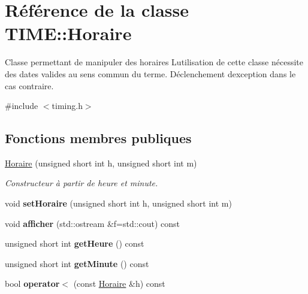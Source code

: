 \hypertarget{class_t_i_m_e_1_1_horaire}{}\section{Référence de la classe T\+I\+M\+E\+:\+:Horaire}
\label{class_t_i_m_e_1_1_horaire}


Classe permettant de manipuler des horaires L\textquotesingle{}utilisation de cette classe nécessite des dates valides au sens commun du terme. Déclenchement d\textquotesingle{}exception dans le cas contraire.  




{\ttfamily \#include $<$timing.\+h$>$}

\subsection*{Fonctions membres publiques}
\begin{DoxyCompactItemize}
\item 
\hyperlink{class_t_i_m_e_1_1_horaire_ab833c9dc3a4fdbda3894dbbd72643813}{Horaire} (unsigned short int h, unsigned short int m)
\begin{DoxyCompactList}\small\item\em Constructeur à partir de heure et minute. \end{DoxyCompactList}\item 
\hypertarget{class_t_i_m_e_1_1_horaire_ae4dd22490e383b0662fc5788bd42d370}{}void {\bfseries set\+Horaire} (unsigned short int h, unsigned short int m)\label{class_t_i_m_e_1_1_horaire_ae4dd22490e383b0662fc5788bd42d370}

\item 
\hypertarget{class_t_i_m_e_1_1_horaire_af4f27b26ed338d7fa03659107f813cf8}{}void {\bfseries afficher} (std\+::ostream \&f=std\+::cout) const \label{class_t_i_m_e_1_1_horaire_af4f27b26ed338d7fa03659107f813cf8}

\item 
\hypertarget{class_t_i_m_e_1_1_horaire_ace5d2381e38d80e99c6a84158a4044e3}{}unsigned short int {\bfseries get\+Heure} () const \label{class_t_i_m_e_1_1_horaire_ace5d2381e38d80e99c6a84158a4044e3}

\item 
\hypertarget{class_t_i_m_e_1_1_horaire_a5b0e73a520913fd0588407c1507344a8}{}unsigned short int {\bfseries get\+Minute} () const \label{class_t_i_m_e_1_1_horaire_a5b0e73a520913fd0588407c1507344a8}

\item 
\hypertarget{class_t_i_m_e_1_1_horaire_a30ec21c5b5cad95c1c17c02c66d796a6}{}bool {\bfseries operator$<$} (const \hyperlink{class_t_i_m_e_1_1_horaire}{Horaire} \&h) const \label{class_t_i_m_e_1_1_horaire_a30ec21c5b5cad95c1c17c02c66d796a6}

\end{DoxyCompactItemize}


